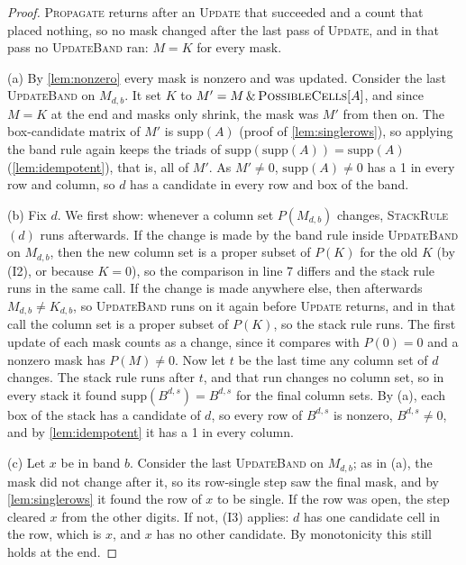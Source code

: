 \documentclass[11pt]{article}
\theoremstyle{definition}
\theoremstyle{plain}
\let\origtextsc\textsc
\renewcommand{\textsc}[1]{\textup{\origtextsc{#1}}}
\begin{document}
\begin{proof}
\textsc{Propagate} returns after an \textsc{Update} that succeeded and a count that placed nothing, so no mask changed
after the last pass of \textsc{Update}, and in that pass no \textsc{UpdateBand} ran: $M=K$ for every mask.

(a) By \cref{lem:nonzero} every mask is nonzero and was updated. Consider the last \textsc{UpdateBand} on
$M_{d,b}$. It set $K$ to $M' = M\,\&\,\textsc{PossibleCells}[A]$, and since $M=K$ at the end and masks only shrink, the
mask was $M'$ from then on. The box-candidate matrix of $M'$ is $\mathrm{supp}(A)$ (proof of \cref{lem:singlerows}), so
applying the band rule again keeps the triads of $\mathrm{supp}(\mathrm{supp}(A))=\mathrm{supp}(A)$
(\cref{lem:idempotent}), that is, all of $M'$. As $M'\neq 0$, $\mathrm{supp}(A)\neq 0$ has a 1 in every row and column,
so $d$ has a candidate in every row and box of the band.

(b) Fix $d$. We first show: whenever a column set $P(M_{d,b})$ changes, \textsc{StackRule}$(d)$ runs afterwards. If the
change is made by the band rule inside \textsc{UpdateBand} on $M_{d,b}$, then the new column set is a proper subset of
$P(K)$ for the old $K$ (by (I2), or because $K=0$), so the comparison in line 7 differs and the stack rule runs in the
same call. If the change is made anywhere else, then afterwards $M_{d,b}\neq K_{d,b}$, so \textsc{UpdateBand} runs on
it again before \textsc{Update} returns, and in that call the column set is a proper subset of $P(K)$, so the stack
rule runs. The first update of each mask counts as a change, since it compares with $P(0)=0$ and a nonzero mask has
$P(M)\neq 0$. Now let $t$ be the last
time any column set of $d$ changes. The stack rule runs after $t$, and that run changes no column set, so in every
stack it found $\mathrm{supp}(B^{d,s})=B^{d,s}$ for the final column sets. By (a), each box of the stack has a candidate
of $d$, so every row of $B^{d,s}$ is nonzero, $B^{d,s}\neq 0$, and by \cref{lem:idempotent} it has a 1 in every
column.

(c) Let $x$ be in band $b$. Consider the last \textsc{UpdateBand} on $M_{d,b}$; as in (a), the mask did not change after
it, so its row-single step saw the final mask, and by \cref{lem:singlerows} it found the row of $x$ to be single. If the
row was open, the step cleared $x$ from the other digits. If not, (I3) applies: $d$ has one candidate cell in the row,
which is $x$, and $x$ has no other candidate. By monotonicity this still holds at the end.
\end{proof}
\end{document}
